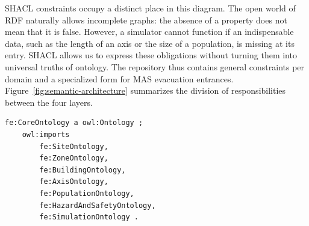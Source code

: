 \documentclass{article}
\begin{document}
SHACL constraints occupy a distinct place in this diagram. The open world of RDF naturally allows incomplete graphs: the absence of a property does not mean that it is false. However, a simulator cannot function if an indispensable data, such as the length of an axis or the size of a population, is missing at its entry. SHACL allows us to express these obligations without turning them into universal truths of ontology. The repository thus contains general constraints per domain and a specialized form for MAS evacuation entrances. Figure~\ref{fig:semantic-architecture} summarizes the division of responsibilities between the four layers.

\begin{lstlisting}[language=Turtle,caption={Module import principle from FE kernel}]
fe:CoreOntology a owl:Ontology ;
    owl:imports
        fe:SiteOntology,
        fe:ZoneOntology,
        fe:BuildingOntology,
        fe:AxisOntology,
        fe:PopulationOntology,
        fe:HazardAndSafetyOntology,
        fe:SimulationOntology .
\end{lstlisting}
\end{document}
